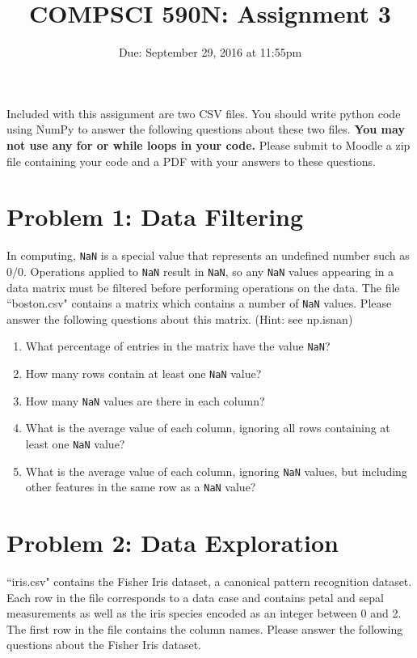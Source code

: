 \documentclass[11pt]{article} %
\title{COMPSCI 590N: Assignment 3}
\date{Due: September 29, 2016 at 11:55pm}
\begin{document}
\thispagestyle{empty}
\pagestyle{empty}

\maketitle
Included with this assignment are two CSV files. You should write python code using NumPy to answer the following questions about these two files. \textbf{You may not use any for or while loops in your code.} Please submit to Moodle a zip file containing your code and a PDF with your answers to these questions.

\section{Problem 1: Data Filtering}

In computing, \verb|NaN| is a special value that represents an undefined number such as $0/0$. Operations applied to \verb|NaN| result in \verb|NaN|, so any \verb|NaN| values appearing in a data matrix must be filtered before performing operations on the data. The file ``boston.csv" contains a matrix which contains a number of \verb|NaN| values. Please answer the following questions about this matrix. (Hint: see np.isnan)

\begin{enumerate}
	\item What percentage of entries in the matrix have the value \verb|NaN|?
	\item How many rows contain at least one \verb|NaN| value?
	\item How many \verb|NaN| values are there in each column?
	\item What is the average value of each column, ignoring all rows containing at least one \verb|NaN| value?
	\item What is the average value of each column, ignoring \verb|NaN| values, but including other features in the same row as a \verb|NaN| value?
\end{enumerate}

\section{Problem 2: Data Exploration}

``iris.csv" contains the Fisher Iris dataset, a canonical pattern recognition dataset. Each row in the file corresponds to a data case and contains petal and sepal measurements as well as the iris species encoded as an integer between 0 and 2. The first row in the file contains the column names. Please answer the following questions about the Fisher Iris dataset.
\end{document}
